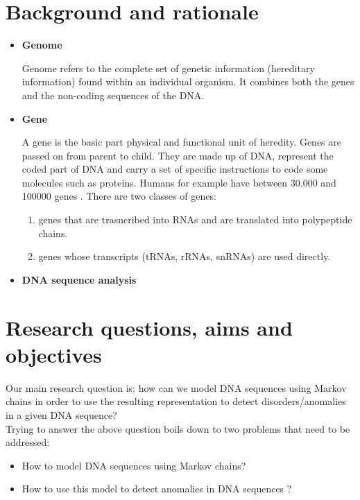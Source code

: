 \documentclass[10pt,twocolumn,letterpaper]{article}
\begin{document}
\section{Background and rationale}
 {
   \begin{itemize}
      \item \textbf{Genome}
      \par Genome refers to the complete set of genetic information (hereditary information) found within an individual organism.
       \cite{krawetz2003introduction} It combines   both the genes and the non-coding sequences of the DNA.
      \item \textbf{Gene} 
      \par A gene is the basic part physical and functional unit of heredity. Genes are passed on from parent to child. They     are made up of DNA, represent the coded part of DNA and carry a set of specific instructions to code some molecules such as proteins. Humans for example have between 30.000 and 100000 genes \cite{krawetz2003introduction}. There are two classes of genes:
      \begin{enumerate}
          \item genes that are trasncribed into RNAs and are translated into polypeptide chains.
          \item genes whose transcripts (tRNAs, rRNAs, snRNAs) are used directly.
      \end{enumerate}
      \item \textbf{DNA sequence analysis}
   \end{itemize}
 }
\section{Research questions, aims and objectives}
 {
    Our main research question is: how can we model DNA sequences using Markov chains in order 
    to use the resulting representation to detect disorders/anomalies in a given DNA sequence?\\
    Trying to answer the above question boils down to two problems that need to be addressed:
    \begin{itemize}
        \item How to model DNA sequences using Markov chains?
        \item How to use this model to detect anomalies in DNA sequences \cite{scientific_american}?
    \end{itemize}

 }
\end{document}
